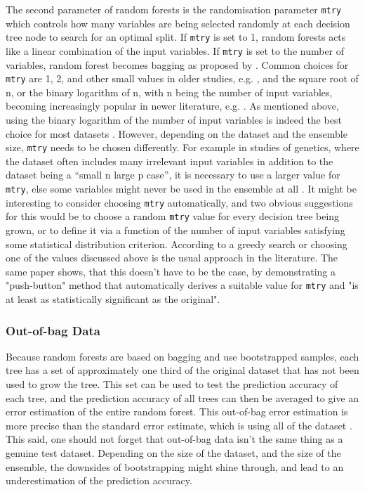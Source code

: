 \documentclass[a4paper,man,12pt,apacite,floatsintext,draftfirst]{apa6} %
\begin{document}
The second parameter of random forests is the randomisation parameter
\texttt{mtry} which controls how many variables are being selected randomly
at each decision tree node to search for an optimal split.
If \texttt{mtry} is set to 1, random forests acts like a linear combination
of the input variables.
If \texttt{mtry} is set to the number of variables, random forest becomes
bagging as proposed by \cite{breiman1996bagging}.
Common choices for \texttt{mtry} are 1, 2, and other small values in
older studies, e.g. \cite{breiman2001random}, and the square root of n,
or the binary logarithm of n, with n being the number of input variables,
becoming increasingly popular in newer literature, e.g.
\cite{strobl2009introduction}.
As mentioned above, using the binary logarithm of the number of
input variables is indeed the best choice for most datasets
\cite{banfield2007comparison}.
However, depending on the dataset and the ensemble size, \texttt{mtry}
needs to be chosen differently.
For example in studies of genetics, where the dataset often includes many
irrelevant input variables in addition to the dataset being a
“small n large p case”, it is necessary to use a larger value
for \texttt{mtry}, else some variables might never be used in the ensemble
at all \cite{strobl2009introduction}.
It might be interesting to consider choosing \texttt{mtry} automatically,
and two obvious suggestions for this would be to choose a random \texttt{mtry}
value for every decision tree being grown, or to define it via a function of the
number of input variables satisfying some statistical distribution criterion.
According to \cite{bernard2008forest} a greedy search or choosing one of
the values discussed above is the usual approach in the literature.
The same paper shows, that this doesn't have to be the case, by demonstrating
a "push-button" method that automatically derives a suitable value for
\texttt{mtry} and "is at least as statistically significant as the original".

\subsubsection{Out-of-bag Data}
Because random forests are based on bagging and use bootstrapped samples,
each tree has a set of approximately one third of the original dataset
that has not been used to grow the tree.
This set can be used to test the prediction accuracy of each tree,
and the prediction accuracy of all trees can then be averaged to give an
error estimation of the entire random forest.
This out-of-bag error estimation is more precise than the standard error
estimate, which is using all of the dataset \cite{strobl2009introduction}.
This said, one should not forget that out-of-bag data isn't the
same thing as a genuine test dataset.
Depending on the size of the dataset, and the size of the ensemble,
the downsides
of bootstrapping might shine through, and lead to an underestimation of
the prediction accuracy.
\end{document}

